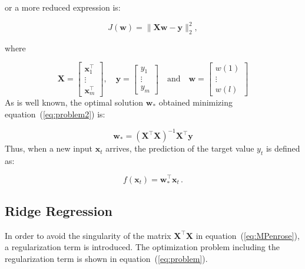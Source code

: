 \noindent or a more reduced expression is:

\begin{equation*}
J(\mathbf{w}) = \| \mathbf{X}\mathbf{w} - \mathbf{y} \|_2^2 ,  
\end{equation*}  

\noindent where

\begin{equation*}
\mathbf{X} = \begin{bmatrix} \mathbf{x}_1^\intercal \\ \vdots \\
\mathbf{x}_m^\intercal \end{bmatrix} , \quad
\mathbf{y} = \begin{bmatrix} y_1 \\ \vdots \\ y_m \end{bmatrix} \quad
\text{and}  \quad
\mathbf{w} = \begin{bmatrix} w(1) \\ \vdots \\ w(l) \end{bmatrix}
\end{equation*}
As is well known, the optimal solution $\mathbf{w}_*$ obtained minimizing
equation~(\ref{eq:problem2}) is:

\begin{equation}
\label{eq:MPenrose}
\mathbf{w}_*=(\mathbf{X}^\intercal \mathbf{X})^{-1}\mathbf{X}^\intercal \mathbf{y}
\end{equation}
Thus, when a new input $\mathbf{x}_t$ arrives, the prediction of the target
value $y_t$ is defined as:

\begin{equation*}
f(\mathbf{x}_t)=\mathbf{w}_*^\intercal \mathbf{x}_t \,.
\end{equation*}

\subsection{Ridge Regression}

In order to avoid the singularity of the matrix $\mathbf{X}^\intercal
\mathbf{X}$ in equation~(\ref{eq:MPenrose}), a regularization term is
introduced.  The optimization problem including the regularization
term is shown in equation~(\ref{eq:problem}). 

%

